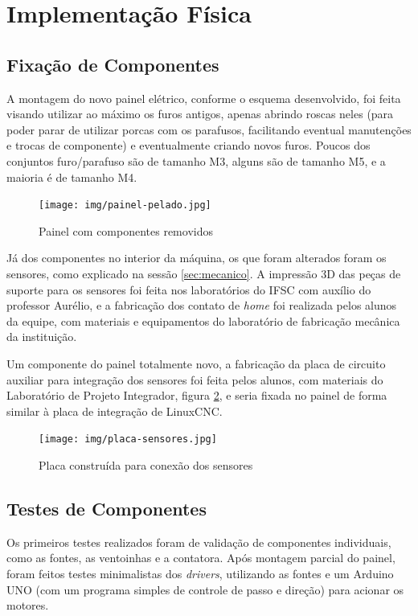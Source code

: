 \documentclass[
	article,			%
	11pt,				%
	oneside,			%
	a4paper,			%
	section=TITLE,		%
	english,			%
	brazil,				%
	sumario=tradicional
	]{abntex2}
\newcommand{\LCNC}{LinuxCNC}
\begin{document}
\section{Implementação Física} 
\subsection{Fixação de Componentes}
A montagem do novo painel elétrico, conforme o esquema desenvolvido, foi feita visando utilizar ao máximo os furos antigos, apenas abrindo roscas neles (para poder parar de utilizar porcas com os parafusos, facilitando eventual manutenções e trocas de componente) e eventualmente criando novos furos. Poucos dos conjuntos furo/parafuso são de tamanho M3, alguns são de tamanho M5, e a maioria é de tamanho M4.

\begin{figure}[H]
    \centering
    \texttt{[image: img/painel-pelado.jpg]}
    \caption{{Painel com componentes removidos}}
    \label{fig:painel-pelado}
\end{figure}

Já dos componentes no interior da máquina, os que foram alterados foram os sensores, como explicado na sessão \ref{sec:mecanico}. A impressão 3D das peças de suporte para os sensores foi feita nos laboratórios do IFSC com auxílio do professor Aurélio, e a fabricação dos contato de \textit{home} foi realizada pelos alunos da equipe, com  materiais e equipamentos do laboratório de fabricação mecânica da instituição.

Um componente do painel totalmente novo, a fabricação da placa de circuito auxiliar para integração dos sensores foi feita pelos alunos, com materiais do Laboratório de Projeto Integrador, figura \ref{fig:placa-sensores}, e seria fixada no painel de forma similar à placa de integração de \LCNC.

\begin{figure}[H]
    \centering
    \texttt{[image: img/placa-sensores.jpg]}
    \caption{Placa construída para conexão dos sensores}
    \label{fig:placa-sensores}
\end{figure}

\subsection{Testes de Componentes}
Os primeiros testes realizados foram de validação de componentes individuais, como as fontes, as ventoinhas e a contatora. Após montagem parcial do painel, foram feitos testes minimalistas dos \textit{drivers}, utilizando as fontes e um Arduino UNO (com um programa simples de controle de passo e direção) para acionar os motores.
\end{document}
